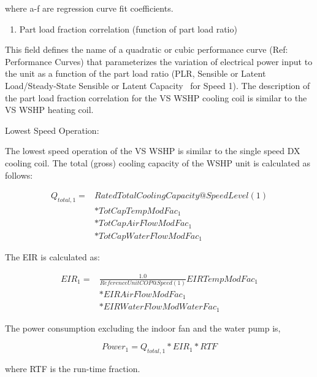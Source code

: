 where a-f are regression curve fit coefficients.

\begin{enumerate}
\def\labelenumi{\arabic{enumi})}
\setcounter{enumi}{7}
\tightlist
\item
  Part load fraction correlation (function of part load ratio)
\end{enumerate}

This field defines the name of a quadratic or cubic performance curve (Ref: Performance Curves) that parameterizes the variation of electrical power input to the unit as a function of the part load ratio (PLR, Sensible or Latent Load/Steady-State Sensible or Latent Capacity~ for Speed 1). The description of the part load fraction correlation for the VS WSHP cooling coil is similar to the VS WSHP heating coil.

Lowest Speed Operation:

The lowest speed operation of the VS WSHP is similar to the single speed DX cooling coil. The total (gross) cooling capacity of the WSHP unit is calculated as follows:

\begin{equation}
 \begin{array}{rl}
  Q_{total,1} =& RatedTotalCoolingCapacity@SpeedLevel\left( 1 \right) \\
              &* TotCapTempModFac_1 \\
              &* TotCapAirFlowModFac_1 \\
              &* TotCapWaterFlowModFac_1
 \end{array}
\end{equation}

The EIR is calculated as:

\begin{equation}
  \begin{array}{rl}
    EIR_1 =& \frac{1.0}{ReferenceUnitCOP@Speed(1)} EIRTempModFac_1 \\
          &* EIRAirFlowModFac_1 \\
          &* EIRWaterFlowModWaterFac_1
  \end{array}
\end{equation}

The power consumption excluding the indoor fan and the water pump is,

\begin{equation}
Powe{r_1} = {Q_{total,1}}*EI{R_1}*RTF
\end{equation}

where RTF is the run-time fraction.


